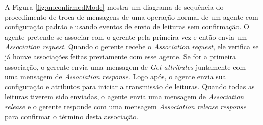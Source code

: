 A Figura \ref{fig:unconfirmedMode} mostra um diagrama de sequência do procedimento de troca de mensagens de uma operação normal de um agente com configuração padrão e usando eventos de envio de leituras sem confirmação. O agente pretende se associar com o gerente pela primeira vez e então envia um \textit{Association request}. Quando o gerente recebe o \textit{Association request}, ele verifica se já houve associações feitas previamente com esse agente. Se for a primeira associação, o gerente envia uma mensagem de \textit{Get attributes} juntamente com uma mensagem de \textit{Association response}. Logo após, o agente envia sua configuração e atributos para iniciar a transmissão de leituras. Quando todas as leituras tiverem sido enviadas, o agente envia uma mensagem de \textit{Association release} e o gerente responde com uma mensagem \textit{Association release response} para confirmar o término desta associação.


